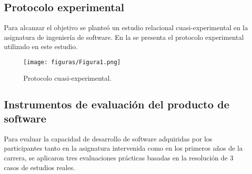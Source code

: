 \documentclass[spanish]{textolivre}
\begin{document}
\subsection{Protocolo experimental}

Para alcanzar el objetivo se planteó un estudio relacional cuasi-experimental en la asignatura de ingeniería de software. En la  se presenta el protocolo experimental utilizado en este estudio.

\begin{figure}[H]
\centering
\begin{minipage}{0.75\textwidth}
 \texttt{[image: figuras/Figura1.png]}
 \caption{Protocolo cuasi-experimental.}
 \label{fig-metodo}
\end{minipage}
\end{figure}


\subsection{Instrumentos de evaluación del producto de software}

Para evaluar la capacidad de desarrollo de software adquiridas por los participantes tanto en la asignatura intervenida como en los primeros años de la carrera, se aplicaron tres evaluaciones prácticas basadas en la resolución de 3 casos de estudios reales. 
\end{document}
